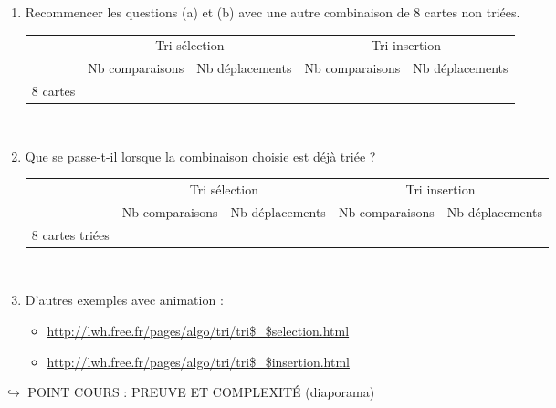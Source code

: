 \documentclass[a4paper,french]{article}
\begin{document}
\begin{enumerate}
\item Recommencer les questions (a) et (b) avec une autre combinaison de 8 cartes non triées. 

\setlength{\extrarowheight}{2mm}
\begin{tabular}{|c|c|c|c|c|}
\cline{2-5}
\multicolumn{1}{c|}{} &\multicolumn{2}{|c|}{Tri sélection} & \multicolumn{2}{|c|}{Tri insertion}
\\ \cline{2-5}
\multicolumn{1}{c|}{}  & Nb comparaisons & Nb déplacements & Nb comparaisons & Nb déplacements \\
\hline
8 cartes &   &   &   &   \\[2mm] \hline
\end{tabular}
\\[2mm]

\item Que se passe-t-il lorsque la combinaison choisie est déjà triée ?

\setlength{\extrarowheight}{2mm}
\begin{tabular}{|c|c|c|c|c|}
\cline{2-5}
\multicolumn{1}{c|}{} &\multicolumn{2}{|c|}{Tri sélection} & \multicolumn{2}{|c|}{Tri insertion}
\\ \cline{2-5}
\multicolumn{1}{c|}{}  & Nb comparaisons & Nb déplacements & Nb comparaisons & Nb déplacements \\
\hline
8 cartes triées &   &   &   &   \\[2mm] \hline
\end{tabular}
\\[2mm]

\item D'autres exemples avec animation :
\begin{itemize}
\item \url{http://lwh.free.fr/pages/algo/tri/tri$\_$selection.html}
\item \url{http://lwh.free.fr/pages/algo/tri/tri$\_$insertion.html}
\end{itemize}
\end{enumerate}
\bigskip

$\hookrightarrow$ POINT COURS : PREUVE ET COMPLEXITÉ (diaporama)
\end{document}
